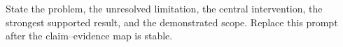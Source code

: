 State the problem, the unresolved limitation, the central intervention, the
strongest supported result, and the demonstrated scope. Replace this prompt
after the claim--evidence map is stable.
